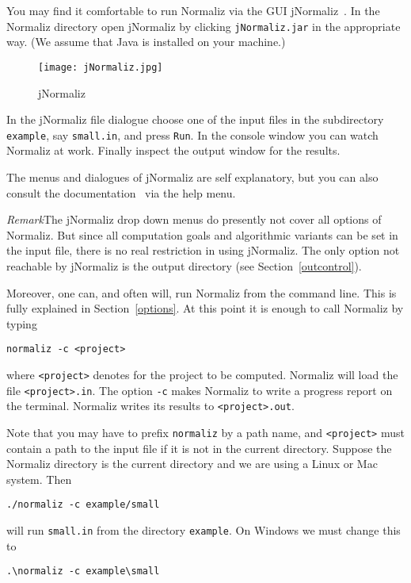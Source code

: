 \documentclass[12pt,a4paper]{scrartcl}
\theoremstyle{definition}
\def\ttt{\texttt}
\begin{document}
You may find it comfortable to run Normaliz via the GUI jNormaliz~\cite{AI}. In the Normaliz directory open jNormaliz by clicking
\ttt{jNormaliz.jar} in the appropriate way. (We assume that
Java is installed on your machine.)
\begin{figure}[bht]
	\centering
	\texttt{[image: jNormaliz.jpg]}\\%
	\caption{jNormaliz}\label{new}
\end{figure}
In the jNormaliz file dialogue choose one of the input files
in the subdirectory \ttt{example}, say \ttt{small.in}, and
press \ttt{Run}. In the console window you can watch Normaliz
at work. Finally inspect the output window for the results.

The menus and dialogues of jNormaliz are self explanatory, but you
can also consult the documentation~\cite{AI} via the help menu.

\emph{Remark}\enspace The jNormaliz drop down menus do presently not cover all options of Normaliz. But since all computation goals and algorithmic variants can be set in the input file, there is no real restriction in using jNormaliz. The only option not reachable by jNormaliz is the output directory (see Section~\ref{outcontrol}).

Moreover, one can, and often will, run Normaliz from the
command line. This is fully explained in Section~\ref{options}. At this point it is enough to call Normaliz by typing
\begin{Verbatim}
normaliz -c <project>
\end{Verbatim}
where \ttt{<project>} denotes for the project to be computed. Normaliz will load the file \ttt{<project>.in}. The option \verb|-c| makes Normaliz to write a progress report on the terminal. Normaliz writes its results to \verb|<project>.out|.

Note that you may have to prefix \ttt{normaliz} by a path name, and \ttt{<project>} must contain a path to the input file if it is not in the current directory. Suppose the Normaliz directory is the current directory and we are using a Linux or Mac system. Then
\begin{Verbatim}
./normaliz -c example/small
\end{Verbatim}
will run \ttt{small.in} from the directory \ttt{example}. On Windows we must change this to
\begin{Verbatim}
.\normaliz -c example\small
\end{Verbatim}
\end{document}

